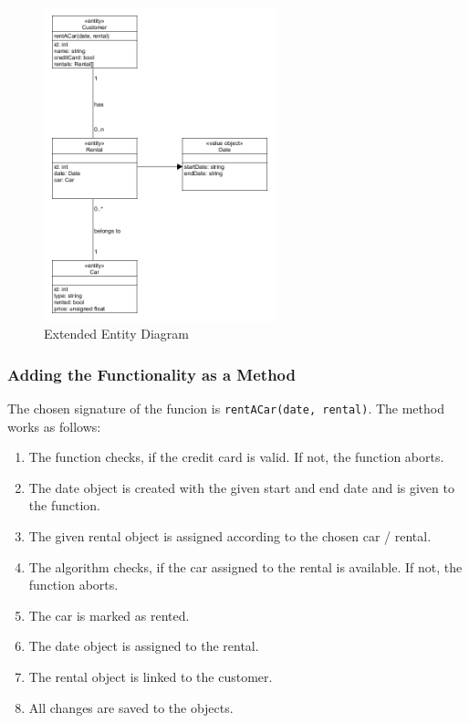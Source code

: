 \begin{figure}[h]
    \centering
    \includegraphics[width=0.6\textwidth]{figures/goLang/carRental/carRental_extendedEntity.png}
    \caption{Extended Entity Diagram}
    \label{fig:extendedEntityDiagram}
\end{figure}

\subsubsection*{Adding the Functionality as a Method}
The chosen signature of the funcion is \texttt{rentACar(date, rental)}.
The method works as follows:
\begin{enumerate}
    \item The function checks, if the credit card is valid. If not, the function aborts.
    \item The date object is created with the given start and end date and is given to the function.
    \item The given rental object is assigned according to the chosen car / rental.
    \item The algorithm checks, if the car assigned to the rental is available. If not, the function aborts.
    \item The car is marked as rented.
    \item The date object is assigned to the rental.
    \item The rental object is linked to the customer.
    \item All changes are saved to the objects.
\end{enumerate}

